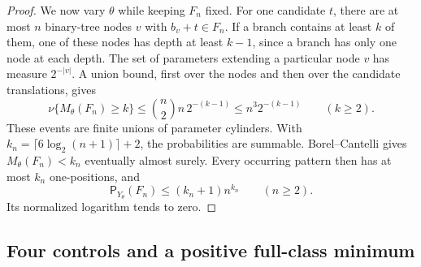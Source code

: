 \documentclass[11pt,reqno]{amsart}
\numberwithin{equation}{section}
\theoremstyle{definition}
\theoremstyle{definition}
\newcommand{\Patt}{\mathsf P}
\begin{document}
\begin{proof}
We now vary $\theta$ while keeping $F_n$ fixed. For one candidate
$t$, there are at most $n$ binary-tree nodes $v$ with
$b_v+t\in F_n$. If a branch contains at least $k$ of them,
one of these nodes has depth at least $k-1$, since a branch has
only one node at each depth. The set of parameters extending a
particular node $v$ has measure $2^{-|v|}$. A union bound, first
over the nodes and then over the candidate translations, gives
\[
 \nu\{M_\theta(F_n)\ge k\}
 \le \binom n2 n\,2^{-(k-1)}
 \le n^3 2^{-(k-1)}\qquad(k\ge2).
\]
These events are finite unions of parameter cylinders. With
$k_n=\lceil6\log_2(n+1)\rceil+2$, the probabilities are summable.
Borel--Cantelli gives $M_\theta(F_n)<k_n$ eventually almost surely.
Every occurring pattern then has at most $k_n$ one-positions, and
\[
 \Patt_{Y_\theta}(F_n)\le(k_n+1)n^{k_n}\qquad(n\ge2).
\]
Its normalized logarithm tends to zero.
\end{proof}

\subsection{Four controls and a positive full-class minimum}
\end{document}
